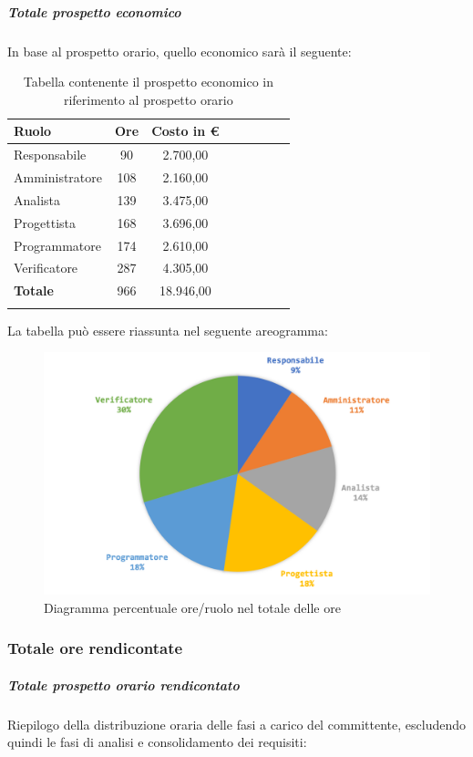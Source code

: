 			\subparagraph{Totale prospetto economico}
			In base al prospetto orario, quello economico sarà il seguente: 
			
			\begin{longtable}{|l|c|c|c|c|c|c|c|}
				\hline
				\rowcolor{lighter-grayer}
				\textbf{Ruolo} & \textbf{Ore} & \textbf{Costo in € } \\
				\hline
				\endfirsthead
				
				\hline
				Responsabile 	    & 90 & 2.700,00\\
				\hline 
				\hline
				Amministratore	  & 108 & 2.160,00\\
				\hline
				\hline
				Analista 				& 139 & 3.475,00\\
				\hline
				\hline
				Progettista 		  & 168 & 3.696,00\\
				\hline
				\hline
				Programmatore 	 & 174 & 2.610,00\\
				\hline
				\hline
				Verificatore 		  & 287 & 4.305,00\\
				\hline
				\textbf{Totale} 	& 966 & 18.946,00\\
				\hline
				\caption{Tabella contenente il prospetto economico in riferimento al prospetto orario}
			\end{longtable}
			
			La tabella può essere riassunta nel seguente areogramma:
			\begin{figure}[H]
				\centering
				\includegraphics[width=0.8\linewidth]{./images/preventivo/totOre2.png}
				\caption{Diagramma percentuale ore/ruolo nel totale delle ore}
				\label{fig:diagramma costi ruolo fase totale ore}
			\end{figure}
			\pagebreak
		
			\subsubsection{Totale ore rendicontate}
				\subparagraph{Totale prospetto orario rendicontato}
				Riepilogo della distribuzione oraria delle fasi a carico del committente, escludendo quindi le fasi di analisi e consolidamento dei requisiti:
				
